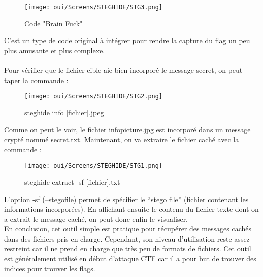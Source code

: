 \begin{figure}[htp!]
  \centering
  \setlength\figureheight{7cm}
  \setlength\figurewidth{9cm}
  \texttt{[image: oui/Screens/STEGHIDE/STG3.png]}
  \caption{Code "Brain Fuck"}
  \label{fig:courbe-tikz}
\end{figure}

C'est un type de code original à intégrer pour rendre la capture du flag un peu plus amusante et plus complexe. \\ \\
Pour vérifier que le fichier cible aie bien incorporé le message secret, on peut taper la commande :


\begin{figure}[htp!]
  \centering
  \setlength\figureheight{7cm}
  \setlength\figurewidth{9cm}
  \texttt{[image: oui/Screens/STEGHIDE/STG2.png]}
  \caption{steghide info [fichier].jpeg}
  \label{fig:courbe-tikz}
\end{figure}

\newpage Comme on peut le voir, le fichier infopicture.jpg est incorporé dans un message crypté nommé secret.txt.
Maintenant, on va extraire le fichier caché avec la commande :

\begin{figure}[htp!]
  \centering
  \setlength\figureheight{7cm}
  \setlength\figurewidth{9cm}
  \texttt{[image: oui/Screens/STEGHIDE/STG1.png]}
  \caption{steghide extract -sf [fichier].txt}
  \label{fig:courbe-tikz}
\end{figure}

L’option -sf (--stegofile) permet de spécifier le “stego file” (fichier contenant les informations incorporées).
En affichant ensuite le contenu du fichier texte dont on a extrait le message caché, on peut donc enfin le visualiser. \\
En conclusion, cet outil simple est pratique pour récupérer des messages cachés dans des fichiers pris en charge. Cependant, son niveau d’utilisation reste assez restreint car il ne prend en charge que très peu de formats de fichiers. Cet outil est généralement utilisé en début d’attaque CTF car il a pour but de trouver des indices pour trouver les flags.
